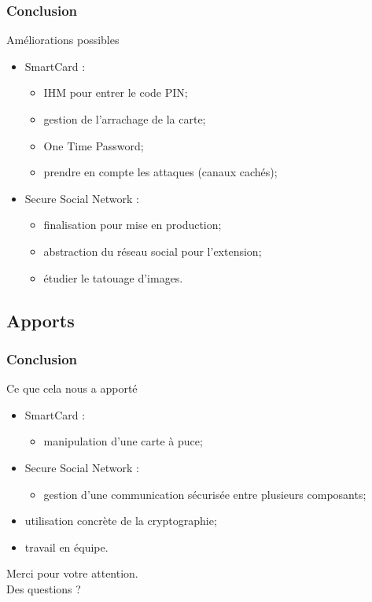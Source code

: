 \documentclass{beamer}
\begin{document}
\begin{frame}
    \frametitle{Conclusion}
    \begin{block}{Améliorations possibles}
        \begin{itemize}
            \item SmartCard : 
                \begin{itemize}
                    \item IHM pour entrer le code PIN; %
                    \item gestion de l'arrachage de la carte; %
                    \item One Time Password;
                    \item prendre en compte les attaques (canaux cachés);
                \end{itemize}
            \item Secure Social Network : 
                \begin{itemize}
                    \item finalisation pour mise en production;
                    \item abstraction du réseau social pour l'extension;
                    \item étudier le tatouage d'images.
                \end{itemize}
        \end{itemize}
    \end{block}
\end{frame}

\subsection{Apports}
\begin{frame}
    \frametitle{Conclusion}
    \begin{block}{Ce que cela nous a apporté}
        \begin{itemize}
            \item SmartCard : 
                \begin{itemize}
                    \item manipulation d'une carte à puce;
                \end{itemize}
            \item Secure Social Network : 
                \begin{itemize}
                    \item gestion d'une communication sécurisée entre plusieurs
                        composants;
                \end{itemize}
            \item utilisation concrète de la cryptographie;
            \item travail en équipe.
        \end{itemize}
    \end{block}
\end{frame}

\begin{frame}
\begin{center}Merci pour votre attention.\\[2cm]
          Des questions ?\end{center}
\end{frame}
\end{document}

